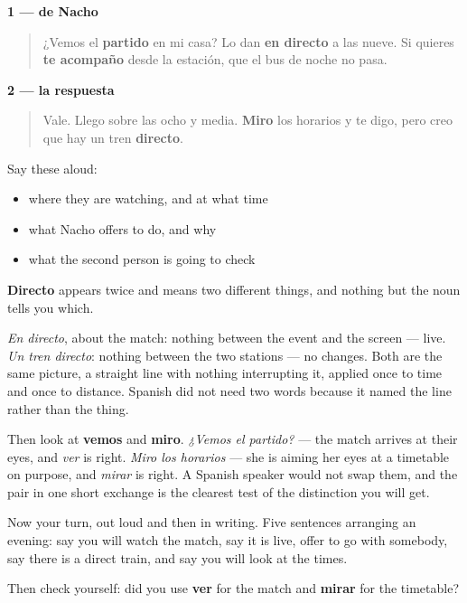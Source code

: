 \textbf{1 — de Nacho}

\begin{quote}
¿Vemos el \textbf{partido} en mi casa? Lo dan \textbf{en directo} a las nueve. Si quieres \textbf{te acompaño} desde la estación, que el bus de noche no pasa.
\end{quote}

\textbf{2 — la respuesta}

\begin{quote}
Vale. Llego sobre las ocho y media. \textbf{Miro} los horarios y te digo, pero creo que hay un tren \textbf{directo}.
\end{quote}

Say these aloud:

\begin{itemize}
\raggedright
  \item where they are watching, and at what time
  \item what Nacho offers to do, and why
  \item what the second person is going to check
\end{itemize}

\begin{culture}
\textbf{Directo} appears twice and means two different things, and nothing but the noun tells you which.

\emph{En directo}, about the match: nothing between the event and the screen — live. \emph{Un tren directo}: nothing between the two stations — no changes. Both are the same picture, a straight line with nothing interrupting it, applied once to time and once to distance. Spanish did not need two words because it named the line rather than the thing.

Then look at \textbf{vemos} and \textbf{miro}. \emph{¿Vemos el partido?} — the match arrives at their eyes, and \emph{ver} is right. \emph{Miro los horarios} — she is aiming her eyes at a timetable on purpose, and \emph{mirar} is right. A Spanish speaker would not swap them, and the pair in one short exchange is the clearest test of the distinction you will get.
\end{culture}

\begin{tcolorbox}[breakable,colback=teal!4,colframe=teal!35!black,title={Before you move on}]
Now your turn, out loud and then in writing. Five sentences arranging an evening: say you will watch the match, say it is live, offer to go with somebody, say there is a direct train, and say you will look at the times.

Then check yourself: did you use \textbf{ver} for the match and \textbf{mirar} for the timetable?
\end{tcolorbox}
